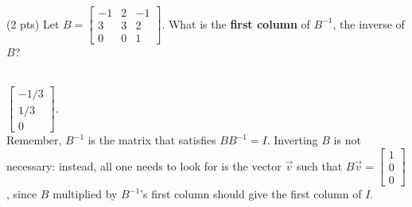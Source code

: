 \documentclass[11pt]{article}
\begin{document}
\begin{prob}
\vspace{0.2in}

\begin{subprob}(2 pts) Let $B = \begin{bmatrix}
        -1 & 2 & -1 \\
        3 & 3 & 2 \\
        0 & 0 & 1
\end{bmatrix}$. What is the \textbf{first column} of $B^{-1}$, the inverse of $B$? \\ \\


\begin{solution}
$\boxed{\begin{bmatrix} -1/3 \\ 1/3 \\ 0\end{bmatrix}}$. \\

Remember, $B^{-1}$ is the matrix that satisfies $B B^{-1} = I$. Inverting $B$ is not necessary: instead, all one needs to look for is the vector $\vec v$ such that $B \vec v = \begin{bmatrix} 1 \\ 0 \\ 0 \end{bmatrix}$, since $B$ multiplied by $B^{-1}$'s first column should give the first column of $I$. \\


\end{solution}
\end{subprob}
\end{prob}
\end{document}
